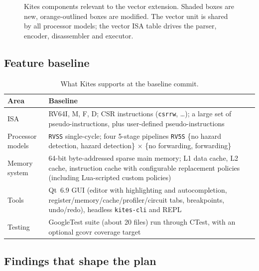 \documentclass[11pt]{article}
\begin{document}
\begin{figure}[htbp]
\caption{Kites components relevant to the vector extension. Shaded boxes are new, orange-outlined
boxes are modified. The vector unit is shared by all processor models; the vector ISA table drives
the parser, encoder, disassembler and executor.}\label{fig:arch}
\end{figure}

\subsection{Feature baseline}

\begin{table}[htbp]
\centering\small
\caption{What Kites supports at the baseline commit.}
\begin{tabularx}{\textwidth}{@{}L{3.4cm}Y@{}}
\toprule
Area & Baseline \\
\midrule
ISA & RV64I, M, F, D; CSR instructions (\texttt{csrrw}, \dots); a large set of pseudo-instructions, plus user-defined pseudo-instructions \\
Processor models & \texttt{RVSS} single-cycle; four 5-stage pipelines \texttt{RV5S} \{no hazard detection, hazard detection\} $\times$ \{no forwarding, forwarding\} \\
Memory system & 64-bit byte-addressed sparse main memory; L1 data cache, L2 cache, instruction cache with configurable replacement policies (including Lua-scripted custom policies) \\
Tools & Qt~6.9 GUI (editor with highlighting and autocompletion, register/memory/cache/profiler/circuit tabs, breakpoints, undo/redo), headless \texttt{kites-cli} and REPL \\
Testing & GoogleTest suite (about 20 files) run through CTest, with an optional gcovr coverage target \\
\bottomrule
\end{tabularx}
\end{table}

\subsection{Findings that shape the plan}\label{sec:findings}
\end{document}
